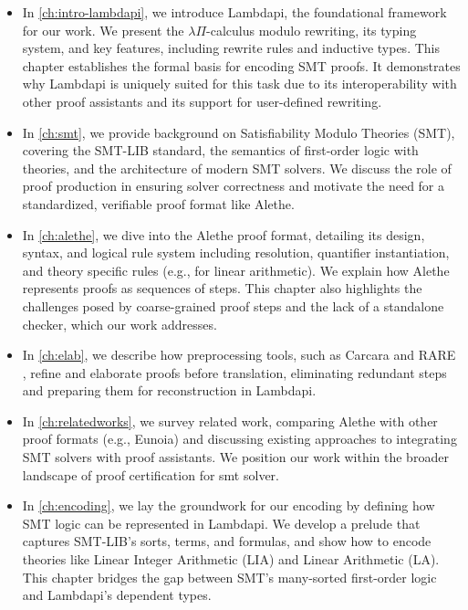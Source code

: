 \begin{itemize}
\item In \cref{ch:intro-lambdapi}, we introduce Lambdapi, the foundational framework for our work.
    We present the $\lambda\Pi$-calculus modulo rewriting, its typing system, and key features, including rewrite rules and inductive types.
    This chapter establishes the formal basis for encoding SMT proofs.
    It demonstrates why Lambdapi is uniquely suited for this task due to its interoperability with other proof assistants and its support for user-defined rewriting.

\item In \cref{ch:smt}, we provide background on Satisfiability Modulo Theories (SMT), covering the SMT-LIB standard, the semantics of first-order logic with theories, and the architecture of modern SMT solvers.
We discuss the role of proof production in ensuring solver correctness and motivate the need for a standardized, verifiable proof format like Alethe.

\item In \cref{ch:alethe}, we dive into the Alethe proof format, detailing its design, syntax, and logical rule system including resolution, quantifier instantiation, and theory specific rules (e.g., for linear arithmetic).
We explain how Alethe represents proofs as sequences of steps.
This chapter also highlights the challenges posed by coarse-grained proof steps and the lack of a standalone checker, which our work addresses.

\item In \cref{ch:elab}, we describe how preprocessing tools, such as Carcara \cite{carcara} and RARE \cite{rare}, refine and elaborate proofs before translation, eliminating redundant steps and preparing them for reconstruction in Lambdapi.

\item In \cref{ch:relatedworks}, we survey related work, comparing Alethe with other proof formats (e.g., Eunoia) and discussing existing approaches to integrating SMT solvers with proof assistants.
    We position our work within the broader landscape of proof certification for smt solver.

\item In \cref{ch:encoding}, we lay the groundwork for our encoding by defining how SMT logic can be represented in Lambdapi.
    We develop a prelude that captures SMT-LIB's sorts, terms, and formulas, and show how to encode theories like Linear Integer Arithmetic (LIA) and Linear Arithmetic (LA).
    This chapter bridges the gap between SMT's many-sorted first-order logic and Lambdapi's dependent types.


\end{itemize}
